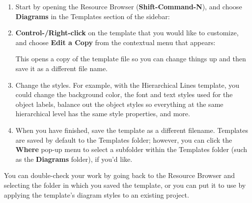 \documentclass[../main.tex]{subfiles}
\begin{document}
\begin{enumerate}
  \item Start by opening the Resource Browser (\textbf{Shift-Command-N}), and choose
    \textbf{Diagrams} in the Templates section of the sidebar:

  \item \textbf{Control-/Right-click} on the template that you would like to customize, and
    choose \textbf{Edit a Copy} from the contextual menu that appears:


    This opens a copy of the template file so you can change things up and then save it as a
    different file name.

  \item Change the styles. For example, with the Hierarchical Lines template, you could change
    the background color, the font and text styles used for the object labels, balance out the
    object styles so everything at the same hierarchical level has the same style properties,
    and more.
  \item When you have finished, save the template as a different filename. Templates are saved
    by default to the Templates folder; however, you can click the \textbf{Where} pop-up menu to
    select a subfolder within the Templates folder (such as the \textbf{Diagrams} folder), if
    you'd like.

\end{enumerate}

You can double-check your work by going back to the Resource Browser and selecting the folder in
which you saved the template, or you can put it to use by applying the template's diagram
styles to an existing project.

\end{document}
